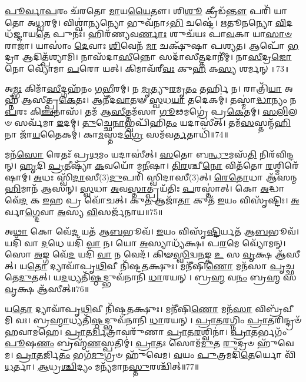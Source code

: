 \-\ul{𑌪𑍂}\-\-\ul{𑌰𑍍𑌵𑌾}\-\-\ul{𑌪}\-𑌰𑌂 𑌚᳴𑌰𑌤𑍋 \ul{𑌮𑌾}\-𑌯\-\ul{𑌯𑍈}\-𑌤𑍗।
𑌶𑌿\-\ul{𑌶𑍂} 𑌕𑍍𑌰𑍀𑌡᳴\-\ul{𑌨𑍍𑌤𑍗} 𑌪𑌰𑌿᳴ 𑌯𑌾𑌤𑍋 𑌅\-\ul{𑌧𑍍𑌵}\-𑌰𑌮𑍍।
𑌵𑌿𑌶𑍍𑌵𑌾॑\-\ul{𑌨𑍍𑌯}\-𑌨𑍍𑌯𑍋 𑌭𑍁𑌵᳴𑌨𑌾𑌽\-\ul{𑌭𑌿} 𑌚𑌷𑍍𑌟𑍇॑।
\-\ul{𑌋}\-𑌤𑍂\-\ul{𑌨}\-𑌨𑍍𑌯𑍋 \ul{𑌵𑌿}\-𑌦𑌧᳴𑌜𑍍𑌜𑌾𑌯\-\ul{𑌤𑍇} 𑌪𑍁𑌨𑌃᳴।
𑌹𑌿𑌰᳴𑌣𑍍𑌯𑌵\-\ul{𑌰𑍍𑌣𑌾𑌃} 𑌶𑍁𑌚᳴𑌯𑌃 𑌪𑌾\-\ul{𑌵}\-𑌕𑌾 𑌯𑌾\-\ul{𑌸𑌾}\-\-\ul{𑍞} 𑌰𑌾𑌜𑌾॑।
𑌯𑌾𑌸𑌾𑌂॑ \ul{𑌦𑍇}\-𑌵𑌾𑌃 \ul{𑌶𑌿}\-𑌵𑍇𑌨᳴ \ul{𑌮𑌾} 𑌚𑌕𑍍𑌷𑍁᳴𑌷𑌾 𑌪𑌶𑍍𑌯𑌤।
𑌆𑌪𑍋᳴ \ul{𑌭}\-𑌦𑍍𑌰𑌾 𑌆𑌦𑌿𑌤𑍍𑌪᳴𑌶𑍍𑌯𑌾𑌮𑌿।
𑌨𑌾𑌸᳴𑌦𑌾\-\ul{𑌸𑍀}\-𑌨𑍍𑌨𑍋 𑌸𑌦𑌾᳴𑌸𑍀\-\ul{𑌤𑍍𑌤}\-𑌦𑌾𑌨𑍀॑𑌮𑍍।
𑌨𑌾\-\ul{𑌸𑍀}\-𑌦𑍍𑌰\-\ul{𑌜𑍋} 𑌨𑍋 𑌵𑍍𑌯𑍋᳴𑌮𑌾 \ul{𑌪}\-𑌰𑍋 𑌯𑌤𑍍।
𑌕𑌿𑌮𑌾𑌵᳴𑌰𑍀\-\ul{𑌵𑌃} 𑌕𑍁\-\ul{𑌹} 𑌕\-\ul{𑌸𑍍𑌯} 𑌶𑌰𑍍𑌮𑌨𑍍॥73॥

𑌅\-\ul{𑌮𑍍𑌭𑌃} 𑌕𑌿𑌮𑌾᳴\-\ul{𑌸𑍀}\-𑌦𑍍𑌗𑌹᳴𑌨𑌂 𑌗\-\ul{𑌭𑍀}\-𑌰𑌮𑍍।
𑌨 \ul{𑌮𑍃}\-𑌤𑍍𑌯𑍁\-\ul{𑌰}\-𑌮𑍃\-\ul{𑌤𑌂} 𑌤𑌰𑍍\mbox{}\-\ul{𑌹𑌿} 𑌨।
𑌰𑌾𑌤𑍍𑌰𑌿᳴\-\ul{𑌯𑌾} 𑌅𑌹𑍍𑌨᳴ 𑌆𑌸𑍀𑌤𑍍𑌪𑍍𑌰\-\ul{𑌕𑍇}\-𑌤𑌃।
𑌆𑌨𑍀᳴𑌦\-\ul{𑌵𑌾}\-𑌤𑍟 \ul{𑌸𑍍𑌵}\-𑌧\-\ul{𑌯𑌾} 𑌤𑌦𑍇𑌕𑌮𑍍॑।
𑌤𑌸𑍍𑌮𑌾॑\-\ul{𑌦𑍍𑌧𑌾}\-𑌨𑍍𑌯𑌂 𑌨 \ul{𑌪}\-𑌰𑌃 𑌕𑌿\-\ul{𑌞𑍍𑌚}\-𑌨𑌾𑌸᳴।
𑌤𑌮᳴ 𑌆\-\ul{𑌸𑍀}\-𑌤𑍍𑌤𑌮᳴𑌸𑌾 \ul{𑌗𑍂}\-𑌢𑌮𑌗𑍍𑌰𑍇॑ 𑌪𑍍𑌰\-\ul{𑌕𑍇}\-𑌤𑌮𑍍।
\-\ul{𑌸}\-\-\ul{𑌲𑌿}\-𑌲𑍞 𑌸𑌰𑍍𑌵᳴𑌮𑌾 \ul{𑌇}\-𑌦𑌮𑍍।
\-\ul{𑌤𑍁}\-𑌚𑍍𑌛𑍇\-\ul{𑌨𑌾}\-𑌭𑍍𑌵𑌪𑌿᳴𑌹𑌿\-\ul{𑌤𑌂} 𑌯𑌦𑌾𑌸𑍀॑𑌤𑍍।
𑌤𑌮᳴\-\ul{𑌸}\-𑌸𑍍𑌤𑌨𑍍𑌮᳴\-\ul{𑌹𑌿}\-𑌨𑌾 𑌜𑌾᳴\-\ul{𑌯}\-𑌤𑍈𑌕𑌮𑍍॑।
𑌕𑌾\-\ul{𑌮}\-𑌸𑍍𑌤𑌦\-\ul{𑌗𑍍𑌰𑍇} 𑌸𑌮᳴𑌵\-\ul{𑌰𑍍𑌤}\-𑌤𑌾𑌧𑌿᳴॥74॥

𑌮𑌨᳴\-\ul{𑌸𑍋} 𑌰𑍇𑌤𑌃᳴ 𑌪𑍍𑌰\-\ul{𑌥}\-𑌮𑌂 𑌯𑌦𑌾𑌸𑍀॑𑌤𑍍।
\-\ul{𑌸}\-𑌤𑍋 𑌬\-\ul{𑌨𑍍𑌧𑍁}\-𑌮𑌸᳴\-\ul{𑌤𑌿} 𑌨𑌿𑌰᳴𑌵𑌿𑌨𑍍𑌦𑌨𑍍।
\-\ul{𑌹𑍃}\-𑌦𑌿 \ul{𑌪𑍍𑌰}\-𑌤𑍀𑌷𑍍𑌯𑌾᳴ \ul{𑌕}\-𑌵𑌯𑍋᳴ 𑌮\-\ul{𑌨𑍀}\-𑌷𑌾।
\-\ul{𑌤𑌿}\-\-\ul{𑌰}\-𑌶𑍍𑌚𑍀\-\ul{𑌨𑍋} 𑌵𑌿𑌤᳴𑌤𑍋 \ul{𑌰}\-𑌶𑍍𑌮𑌿𑌰𑍇᳴𑌷𑌾𑌮𑍍।
\-\ul{𑌅}\-𑌧𑌃 𑌸𑍍𑌵𑌿᳴\-\ul{𑌦𑌾}\-𑌸𑍀(3)\-\ul{𑌦𑍁}\-𑌪𑌰𑌿᳴ 𑌸𑍍𑌵𑌿𑌦𑌾𑌸𑍀(3)𑌤𑍍।
\-\ul{𑌰𑍇}\-\-\ul{𑌤𑍋}\-𑌧𑌾 𑌆᳴𑌸𑌨𑍍𑌮\-\ul{𑌹𑌿}\-𑌮𑌾𑌨᳴ 𑌆𑌸𑌨𑍍।
\-\ul{𑌸𑍍𑌵}\-𑌧𑌾 \ul{𑌅}\-𑌵\-\ul{𑌸𑍍𑌤𑌾}\-𑌤𑍍𑌪𑍍𑌰𑌯᳴𑌤𑌿𑌃 \ul{𑌪}\-𑌰𑌸𑍍𑌤𑌾॑𑌤𑍍।
𑌕𑍋 \ul{𑌅}\-𑌦𑍍𑌧𑌾 𑌵𑍇᳴\-\ul{𑌦} 𑌕 \ul{𑌇}\-𑌹 𑌪𑍍𑌰 𑌵𑍋᳴𑌚𑌤𑍍।
𑌕𑍁\-\ul{𑌤} 𑌆𑌜𑌾᳴\-\ul{𑌤𑌾} 𑌕𑍁𑌤᳴ \ul{𑌇}\-𑌯𑌂 𑌵𑌿𑌸𑍃᳴𑌷𑍍𑌟𑌿𑌃।
\-\ul{𑌅}\-𑌰𑍍𑌵𑌾\-\ul{𑌗𑍍𑌦𑍇}\-𑌵𑌾 \ul{𑌅}\-𑌸𑍍𑌯 \ul{𑌵𑌿}\-𑌸𑌰𑍍𑌜᳴𑌨𑌾𑌯॥75॥

𑌅\-\ul{𑌥𑌾} 𑌕𑍋 𑌵𑍇᳴\-\ul{𑌦} 𑌯𑌤᳴ 𑌆\-\ul{𑌬}\-𑌭𑍂𑌵᳴।
\-\ul{𑌇}\-𑌯𑌂 𑌵𑌿𑌸𑍃᳴\-\ul{𑌷𑍍𑌟𑌿}\-𑌰𑍍𑌯𑌤᳴ 𑌆\-\ul{𑌬}\-𑌭𑍂𑌵᳴।
𑌯𑌦𑌿᳴ 𑌵𑌾 \ul{𑌦}\-𑌧𑍇 𑌯𑌦𑌿᳴ \ul{𑌵𑌾} 𑌨।
𑌯𑍋 \ul{𑌅}\-𑌸𑍍𑌯𑌾𑌧𑍍𑌯᳴𑌕𑍍𑌷𑌃 𑌪\-\ul{𑌰}\-𑌮𑍇 𑌵𑍍𑌯𑍋᳴𑌮𑌨𑍍।
𑌸𑍋 \ul{𑌅}\-𑌙𑍍𑌗 𑌵𑍇᳴\-\ul{𑌦} 𑌯𑌦𑌿᳴ \ul{𑌵𑌾} 𑌨 𑌵𑍇𑌦᳴।
𑌕𑌿𑍟\-\ul{𑌸𑍍𑌵𑌿}\-𑌦𑍍𑌵\-\ul{𑌨}\-𑌙𑍍𑌕 \ul{𑌉} 𑌸 \ul{𑌵𑍃}\-𑌕𑍍𑌷 𑌆᳴𑌸𑍀𑌤𑍍।
𑌯\-\ul{𑌤𑍋} 𑌦𑍍𑌯𑌾𑌵𑌾᳴𑌪𑍃\-\ul{𑌥𑌿}\-𑌵𑍀 𑌨𑌿᳴𑌷𑍍𑌟\-\ul{𑌤}\-𑌕𑍍𑌷𑍁𑌃।
𑌮𑌨𑍀᳴𑌷𑌿\-\ul{𑌣𑍋} 𑌮𑌨᳴𑌸𑌾 \ul{𑌪𑍃}\-𑌚𑍍𑌛𑌤𑍇\-\ul{𑌦𑍁}\-𑌤𑌤𑍍।
𑌯\-\ul{𑌦}\-𑌧𑍍𑌯𑌤𑌿᳴\-\ul{𑌷𑍍𑌠}\-𑌦𑍍𑌭𑍁𑌵᳴𑌨𑌾𑌨𑌿 \ul{𑌧𑌾}\-𑌰𑌯𑌨𑍍।
𑌬𑍍𑌰\-\ul{𑌹𑍍𑌮} 𑌵\-\ul{𑌨𑌂} 𑌬𑍍𑌰\-\ul{𑌹𑍍𑌮} 𑌸 \ul{𑌵𑍃}\-𑌕𑍍𑌷 𑌆᳴𑌸𑍀𑌤𑍍॥76॥

𑌯\-\ul{𑌤𑍋} 𑌦𑍍𑌯𑌾𑌵𑌾᳴𑌪𑍃\-\ul{𑌥𑌿}\-𑌵𑍀 𑌨𑌿᳴𑌷𑍍𑌟\-\ul{𑌤}\-𑌕𑍍𑌷𑍁𑌃।
𑌮𑌨𑍀᳴𑌷𑌿\-\ul{𑌣𑍋} 𑌮𑌨᳴\-\ul{𑌸𑌾} 𑌵𑌿𑌬𑍍𑌰᳴𑌵𑍀𑌮𑌿 𑌵𑌃।
𑌬𑍍𑌰\-\ul{𑌹𑍍𑌮𑌾}\-𑌧𑍍𑌯𑌤𑌿᳴\-\ul{𑌷𑍍𑌠}\-𑌦𑍍𑌭𑍁𑌵᳴𑌨𑌾𑌨𑌿 \ul{𑌧𑌾}\-𑌰𑌯𑌨𑍍।
\-\ul{𑌪𑍍𑌰𑌾}\-𑌤\-\ul{𑌰}\-𑌗𑍍𑌨𑌿𑌂 \ul{𑌪𑍍𑌰𑌾}\-𑌤𑌰𑌿𑌨𑍍𑌦𑍍𑌰𑍞᳴ 𑌹𑌵𑌾𑌮𑌹𑍇।
\-\ul{𑌪𑍍𑌰𑌾}\-𑌤\-\ul{𑌰𑍍𑌮𑌿}\-𑌤𑍍𑌰𑌾𑌵𑌰𑍁᳴𑌣𑌾 \ul{𑌪𑍍𑌰𑌾}\-𑌤\-\ul{𑌰}\-𑌶𑍍𑌵𑌿𑌨𑌾॑।
\-\ul{𑌪𑍍𑌰𑌾}\-𑌤𑌰𑍍𑌭𑌗𑌂᳴ \ul{𑌪𑍂}\-𑌷\-\ul{𑌣𑌂} 𑌬𑍍𑌰𑌹𑍍𑌮᳴\-\ul{𑌣}\-𑌸𑍍𑌪𑌤𑌿𑌮𑍍॑।
\-\ul{𑌪𑍍𑌰𑌾}\-𑌤𑌃 𑌸𑍋𑌮᳴\-\ul{𑌮𑍁}\-𑌤 \ul{𑌰𑍁}\-𑌦𑍍𑌰𑍞 𑌹𑍁᳴𑌵𑍇𑌮।
\-\ul{𑌪𑍍𑌰𑌾}\-\-\ul{𑌤}\-𑌰𑍍𑌜𑌿\-\ul{𑌤𑌂} 𑌭𑌗᳴\-\ul{𑌮𑍁}\-𑌗𑍍𑌰𑍞 𑌹𑍁᳴𑌵𑍇𑌮।
\-\ul{𑌵}\-𑌯𑌂 \ul{𑌪𑍁}\-𑌤𑍍𑌰𑌮𑌦𑌿᳴\-\ul{𑌤𑍇}\-𑌰𑍍𑌯𑍋 𑌵𑌿᳴\-\ul{𑌧}\-𑌰𑍍𑌤𑌾।
\-\ul{𑌆}\-𑌧𑍍𑌰\-\ul{𑌶𑍍𑌚𑌿}\-𑌦𑍍𑌯𑌂 𑌮𑌨𑍍𑌯᳴𑌮𑌾𑌨\-\ul{𑌸𑍍𑌤𑍁}\-𑌰𑌶𑍍𑌚𑌿᳴𑌤𑍍॥77॥

